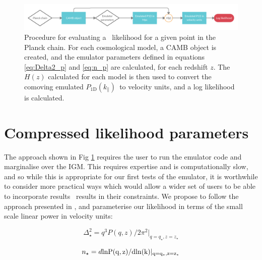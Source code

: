 \documentclass[preprintnumbers,prd,superscriptaddress,notitlepage,nofootinbib] {revtex4-1}
\newcommand{\fluxpower}{$P_\mathrm{1D}(k_\parallel)$}
\begin{document}
\begin{figure}[ht]
    \begin{center}
     \includegraphics[scale=0.2]{Figures/Parameter_mapping.png}
    \end{center}
    \caption{Procedure for evaluating a \lyaf\ likelihood for a given
    point in the Planck chain.
    For each cosmological
    model, a \textsc{CAMB} object is created, and the emulator parameters defined
    in equations \ref{eq:Delta2_p} and \ref{eq:n_p} are calculated, for each redshift $z$.
    The $H(z)$ calculated
    for each model is then used to convert the comoving emulated \fluxpower\
    to velocity units, and a log likelihood is calculated.}
    \label{fig:param_map1}
\end{figure}



\section{Compressed likelihood parameters}
\label{sec:compressed}
The approach shown in Fig \ref{fig:param_map1} requires the user to run the emulator
code and marginalise over the IGM. This requires expertise and is computationally slow,
and so while this is appropriate for our first tests of the emulator, it is worthwhile to
consider more practical ways which would allow a wider set of users to be able to
incorporate results \lyaf\ results in their constraints. We propose to follow
the approach presented in \cite{McDonald2005a}, and parameterise our likelihood
in terms of the small scale linear power in velocity units:

\begin{equation}
    \label{eq:Delta2_star}
    \Delta^2_\star=q^3P(q, z)/2\pi^2|_{q=q_\star,z=z_\star}
\end{equation}

\begin{equation}
    \label{eq:n_star}
    n_\star=d\rm{ln}P(q,z) / d \rm{ln}(k)|_{q=q_\star,z=z_\star}
\end{equation}
\end{document}
